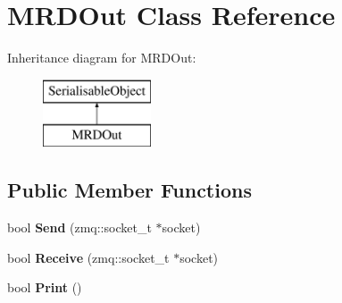 \hypertarget{classMRDOut}{\section{M\-R\-D\-Out Class Reference}
\label{classMRDOut}
}
Inheritance diagram for M\-R\-D\-Out\-:\begin{figure}[H]
\begin{center}
\leavevmode
\includegraphics[height=2.000000cm]{classMRDOut}
\end{center}
\end{figure}
\subsection*{Public Member Functions}
\begin{DoxyCompactItemize}
\item 
\hypertarget{classMRDOut_a2c72c51c7288bd4ed73d4c9de0509150}{bool {\bfseries Send} (zmq\-::socket\-\_\-t $\ast$socket)}\label{classMRDOut_a2c72c51c7288bd4ed73d4c9de0509150}

\item 
\hypertarget{classMRDOut_a7e83eb6f2ac421109f907235d4211571}{bool {\bfseries Receive} (zmq\-::socket\-\_\-t $\ast$socket)}\label{classMRDOut_a7e83eb6f2ac421109f907235d4211571}

\item 
\hypertarget{classMRDOut_a956aa4f1b5746c9e12e7b69980d58b62}{bool {\bfseries Print} ()}\label{classMRDOut_a956aa4f1b5746c9e12e7b69980d58b62}

\end{DoxyCompactItemize}

